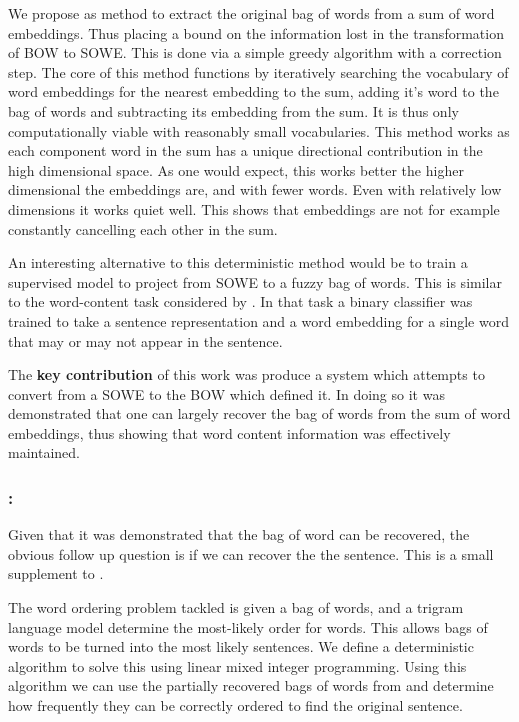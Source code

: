 \documentclass{book}
\begin{document}
We propose as method to extract the original bag of words from a sum of word embeddings. Thus placing a bound on the information lost in the transformation of BOW to SOWE. This is done via a simple greedy algorithm with a correction step.
The core of this method functions by iteratively searching the vocabulary of word embeddings for the nearest embedding to the sum,
adding it's word to the bag of words and subtracting its embedding from the sum.
It is thus only computationally viable with reasonably small vocabularies.
This method works as each component word in the sum has a unique directional contribution in the high dimensional space.
As one would expect, this works better the higher dimensional the embeddings are, and with fewer words.
Even with relatively low dimensions it works quiet well.
This shows that embeddings are not for example constantly cancelling each other in the sum.





An interesting alternative to this deterministic method would be to train a supervised model to project from SOWE to a fuzzy bag of words.
This is similar to the word-content task considered by
\citet{adi2017Probing}.
In that task a binary classifier was trained to take a sentence representation and a word embedding for a single word that may or may not appear in the sentence.


The \textbf{key contribution} of this work was produce a system which attempts to convert from a SOWE to the BOW which defined it.
In doing so it was demonstrated that one can largely recover the bag of words from the sum of word embeddings, thus showing that word content information was effectively maintained.


\subsubsection{: }
Given that it was demonstrated that the bag of word can be recovered,
the obvious follow up question is if we can recover the the sentence.
This  is a small supplement to .

The word ordering problem tackled is given a bag of words,
and a trigram language model determine the most-likely order for words.
This allows bags of words to be turned into the most likely sentences.
We define a deterministic algorithm to solve this using linear mixed integer programming.
Using this algorithm we can use the partially recovered bags of words from  and determine how frequently they can be correctly ordered to find the original sentence.
\end{document}
